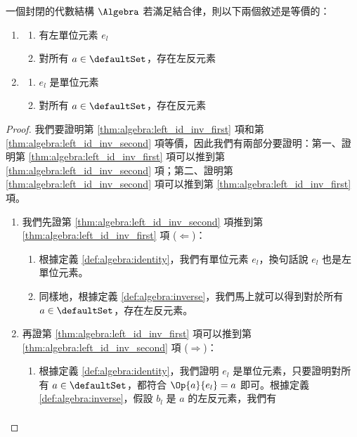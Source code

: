 \documentclass[12pt,a4paper,oneside]{report}
\begin{document}
\begin{CJK}{UTF8}{bkai}
\begin{mythm}
\label{thm:algebra:left_identity_inverse}
一個封閉的代數結構 $\Algebra$ 若滿足結合律，則以下兩個敘述是等價的：
\begin{enumerate}
\item \label{thm:algebra:left_id_inv_first}
    \begin{enumerate}
    \item 有左單位元素 $e_l$
    \item 對所有 $a\in{\defaultSet}$，存在左反元素
    \end{enumerate}
\item \label{thm:algebra:left_id_inv_second}
    \begin{enumerate}
    \item $e_l$ 是單位元素
    \item \label{exe:algebra:left_identity_inverse}對所有 $a\in{\defaultSet}$，存在反元素
    \end{enumerate}
\end{enumerate}
\end{mythm}
\begin{proof}
我們要證明第 \ref{thm:algebra:left_id_inv_first} 項和第 \ref{thm:algebra:left_id_inv_second} 項等價，因此我們有兩部分要證明：第一、證明第 \ref{thm:algebra:left_id_inv_first} 項可以推到第 \ref{thm:algebra:left_id_inv_second} 項；第二、證明第 \ref{thm:algebra:left_id_inv_second} 項可以推到第 \ref{thm:algebra:left_id_inv_first} 項。
\begin{enumerate}
\item 我們先證第 \ref{thm:algebra:left_id_inv_second} 項推到第 \ref{thm:algebra:left_id_inv_first} 項 ($\Leftarrow$)：
    \begin{enumerate}
    \item 根據定義 \ref{def:algebra:identity}，我們有單位元素 $e_l$，換句話說 $e_l$ 也是左單位元素。
    \item 同樣地，根據定義 \ref{def:algebra:inverse}，我們馬上就可以得到對於所有 $a\in{\defaultSet}$，存在左反元素。
    \end{enumerate}
\item 再證第 \ref{thm:algebra:left_id_inv_first} 項可以推到第 \ref{thm:algebra:left_id_inv_second} 項 ($\Rightarrow$)：
    \begin{enumerate}
    \item 根據定義 \ref{def:algebra:identity}，我們證明 $e_l$ 是單位元素，只要證明對所有 $a\in{\defaultSet}$，都符合 $\Op{a}{e_l}=a$ 即可。根據定義 \ref{def:algebra:inverse}，假設 $b_l$ 是 $a$ 的左反元素，我們有
    \begin{align*}

\end{align*}
\end{enumerate}
\end{enumerate}
\end{proof}
\end{CJK}
\end{document}
